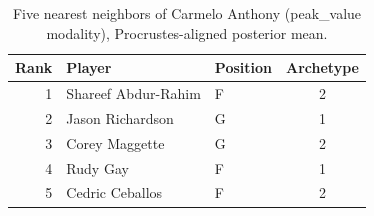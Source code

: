 \begin{table}[htbp]
  \centering\small
  \begin{tabular}{rllc}
    \toprule
    Rank & Player & Position & Archetype \\
    \midrule
    1 & Shareef Abdur-Rahim & F & 2 \\
    2 & Jason Richardson & G & 1 \\
    3 & Corey Maggette & G & 2 \\
    4 & Rudy Gay & F & 1 \\
    5 & Cedric Ceballos & F & 2 \\
    \bottomrule
  \end{tabular}
  \caption{Five nearest neighbors of Carmelo Anthony (peak_value modality), Procrustes-aligned posterior mean.}
  \label{tab:Carmelo_Anthony_neighbors_peak_value}
\end{table}

